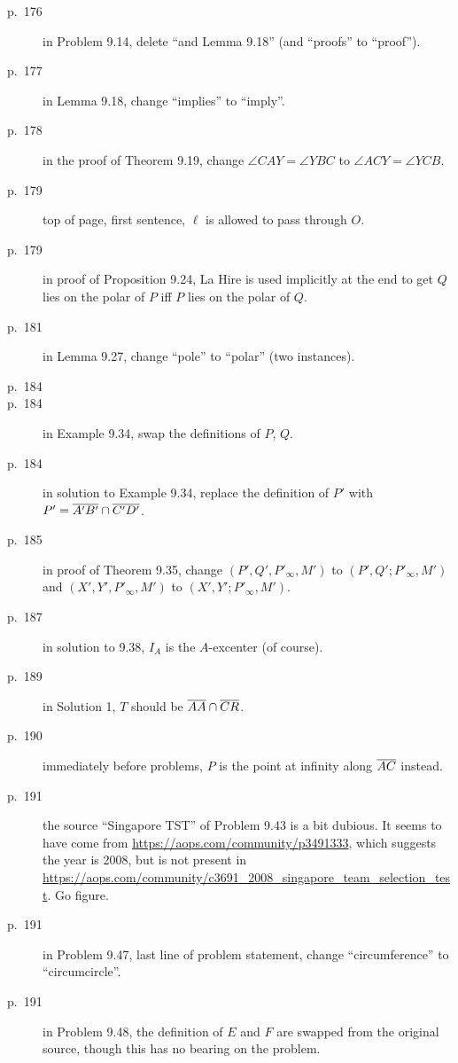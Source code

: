 \documentclass[11pt]{scrartcl}
\begin{document}
\begin{description}
\item[p.\  176] in Problem 9.14, delete ``and Lemma 9.18'' (and ``proofs'' to ``proof'').
\item[p.\  177] in Lemma 9.18, change ``implies'' to ``imply''.
\item[p.\  178] in the proof of Theorem 9.19, change $\angle CAY = \angle YBC$ to $\angle ACY = \angle YCB$.
\item[p.\  179] top of page, first sentence, $\ell$ is allowed to pass through $O$.
\item[p.\  179] in proof of Proposition 9.24, La Hire is used implicitly at the end
  to get $Q$ lies on the polar of $P$ iff $P$ lies on the polar of $Q$.
\item[p.\  181] in Lemma 9.27, change ``pole'' to ``polar'' (two instances).
\item[p.\  184] 
\item[p.\  184] in Example 9.34, swap the definitions of $P$, $Q$.
\item[p.\  184] in solution to Example 9.34,
  replace the definition of $P'$ with $P' = \overline{A'B'} \cap \overline{C'D'}$.
\item[p.\  185] in proof of Theorem 9.35, change
  $(P', Q', P'_\infty, M')$ to $(P', Q'; P'_\infty, M')$
  and $(X', Y', P'_\infty, M')$ to $(X', Y'; P'_\infty, M')$.
\item[p.\  187] in solution to 9.38, $I_A$ is the $A$-excenter (of course).
\item[p.\  189] in Solution 1, $T$ should be $\overline{AA} \cap \overline{CR}$.
\item[p.\  190] immediately before problems, $P$ is the point at infinity along $\overline{AC}$ instead.
\item[p.\  191] the source ``Singapore TST'' of Problem 9.43 is a bit dubious.
  It seems to have come from \url{https://aops.com/community/p3491333},
  which suggests the year is 2008,
  but is not present in \url{https://aops.com/community/c3691_2008_singapore_team_selection_test}.
  Go figure.
\item[p.\  191] in Problem 9.47, last line of problem statement,
  change ``circumference'' to ``circumcircle''.
\item[p.\  191] in Problem 9.48, the definition of $E$ and $F$ are swapped from
  the original source, though this has no bearing on the problem.

\end{description}
\end{document}
